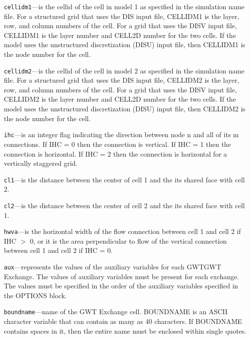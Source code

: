 \begin{description}
\item \texttt{cellidm1}---is the cellid of the cell in model 1 as specified in the simulation name file. For a structured grid that uses the DIS input file, CELLIDM1 is the layer, row, and column numbers of the cell.   For a grid that uses the DISV input file, CELLIDM1 is the layer number and CELL2D number for the two cells.  If the model uses the unstructured discretization (DISU) input file, then CELLIDM1 is the node number for the cell.

\item \texttt{cellidm2}---is the cellid of the cell in model 2 as specified in the simulation name file. For a structured grid that uses the DIS input file, CELLIDM2 is the layer, row, and column numbers of the cell.   For a grid that uses the DISV input file, CELLIDM2 is the layer number and CELL2D number for the two cells.  If the model uses the unstructured discretization (DISU) input file, then CELLIDM2 is the node number for the cell.

\item \texttt{ihc}---is an integer flag indicating the direction between node n and all of its m connections. If IHC = 0 then the connection is vertical.  If IHC = 1 then the connection is horizontal. If IHC = 2 then the connection is horizontal for a vertically staggered grid.

\item \texttt{cl1}---is the distance between the center of cell 1 and the its shared face with cell 2.

\item \texttt{cl2}---is the distance between the center of cell 2 and the its shared face with cell 1.

\item \texttt{hwva}---is the horizontal width of the flow connection between cell 1 and cell 2 if IHC $>$ 0, or it is the area perpendicular to flow of the vertical connection between cell 1 and cell 2 if IHC = 0.

\item \texttt{aux}---represents the values of the auxiliary variables for each GWTGWT Exchange. The values of auxiliary variables must be present for each exchange. The values must be specified in the order of the auxiliary variables specified in the OPTIONS block.

\item \texttt{boundname}---name of the GWT Exchange cell.  BOUNDNAME is an ASCII character variable that can contain as many as 40 characters.  If BOUNDNAME contains spaces in it, then the entire name must be enclosed within single quotes.

\end{description}

